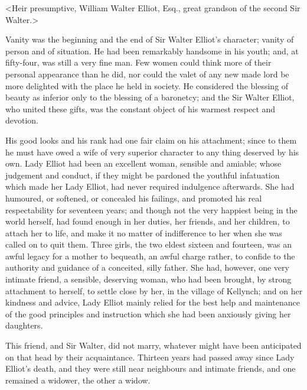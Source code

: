 <Heir presumptive, William Walter Elliot, Esq., great grandson of the second Sir Walter.>

Vanity was the beginning and the end of Sir Walter Elliot's character; vanity of person and of situation. He had been remarkably handsome in his youth; and, at fifty-four, was still a very fine man. Few women could think more of their personal appearance than he did, nor could the valet of any new made lord be more delighted with the place he held in society. He considered the blessing of beauty as inferior only to the blessing of a baronetcy; and the Sir Walter Elliot, who united these gifts, was the constant object of his warmest respect and devotion.

His good looks and his rank had one fair claim on his attachment; since to them he must have owed a wife of very superior character to any thing deserved by his own. Lady Elliot had been an excellent woman, sensible and amiable; whose judgement and conduct, if they might be pardoned the youthful infatuation which made her Lady Elliot, had never required indulgence afterwards. She had humoured, or softened, or concealed his failings, and promoted his real respectability for seventeen years; and though not the very happiest being in the world herself, had found enough in her duties, her friends, and her children, to attach her to life, and make it no matter of indifference to her when she was called on to quit them. Three girls, the two eldest sixteen and fourteen, was an awful legacy for a mother to bequeath, an awful charge rather, to confide to the authority and guidance of a conceited, silly father. She had, however, one very intimate friend, a sensible, deserving woman, who had been brought, by strong attachment to herself, to settle close by her, in the village of Kellynch; and on her kindness and advice, Lady Elliot mainly relied for the best help and maintenance of the good principles and instruction which she had been anxiously giving her daughters.

This friend, and Sir Walter, did not marry, whatever might have been anticipated on that head by their acquaintance. Thirteen years had passed away since Lady Elliot's death, and they were still near neighbours and intimate friends, and one remained a widower, the other a widow.

